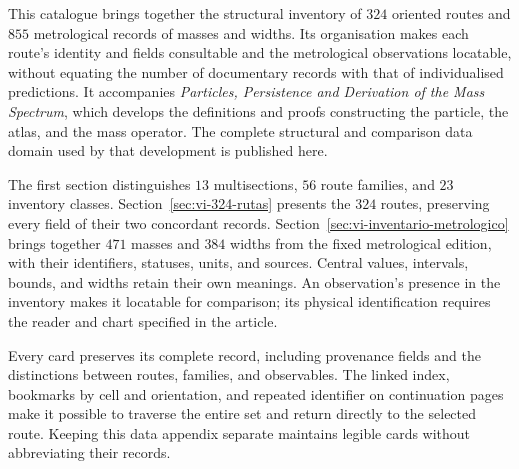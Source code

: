 \documentclass[a4paper,10pt]{article}
\begin{document}
\begin{minipage}{\textwidth}
This catalogue brings together the structural inventory of \(324\)
oriented routes and \(855\) metrological records of masses and widths.
Its organisation makes each route's identity and fields consultable and
the metrological observations locatable, without equating the number of documentary records
with that of individualised predictions. It accompanies \emph{Particles,
Persistence and Derivation of the Mass Spectrum}, which develops the
definitions and proofs constructing the particle, the atlas, and the
mass operator. The complete structural and comparison data domain used
by that development is published here.

The first section distinguishes \(13\) multisections, \(56\) route
families, and \(23\) inventory classes.
Section~\ref{sec:vi-324-rutas} presents the \(324\) routes, preserving
every field of their two concordant records.
Section~\ref{sec:vi-inventario-metrologico} brings together \(471\) masses
and \(384\) widths from the fixed metrological edition, with their
identifiers, statuses, units, and sources. Central values, intervals,
bounds, and widths retain their own meanings. An observation's presence
in the inventory makes it locatable for comparison; its physical
identification requires the reader and chart specified in the article.

Every card preserves its complete record, including provenance fields
and the distinctions between routes, families, and observables. The
linked index, bookmarks by cell and orientation, and repeated identifier
on continuation pages make it possible to traverse the entire set and
return directly to the selected route. Keeping this data appendix
separate maintains legible cards without abbreviating their records.\par
\end{minipage}
\par\endgroup
\clearpage
\tableofcontents
\clearpage



\end{document}
